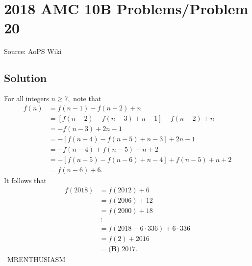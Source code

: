 \documentclass[12pt]{article}
\begin{document}
\section*{{2018 AMC 10B Problems/Problem 20}}
Source: AoPS Wiki

\subsection*{Solution}
For all integers $n \geq 7,$ note that \begin{align*} f(n)&=f(n-1)-f(n-2)+n \\ &=[f(n-2)-f(n-3)+n-1]-f(n-2)+n \\ &=-f(n-3)+2n-1 \\ &=-[f(n-4)-f(n-5)+n-3]+2n-1 \\ &=-f(n-4)+f(n-5)+n+2 \\ &=-[f(n-5)-f(n-6)+n-4]+f(n-5)+n+2 \\ &=f(n-6)+6. \end{align*} It follows that \begin{align*} f(2018)&=f(2012)+6 \\ &=f(2006)+12 \\ &=f(2000)+18 \\ & \ \vdots \\ &=f(2018-6\cdot336)+6\cdot336 \\ &=f(2)+2016 \\ &=\boxed{\textbf{(B) } 2017}. \end{align*} ~MRENTHUSIASM
\end{document}
